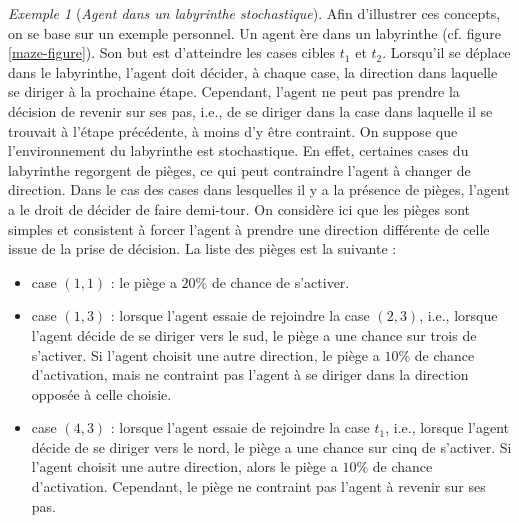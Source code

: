 \documentclass[12pt,a4paper]{report}
\theoremstyle{definition}%
\theoremstyle{remark}
\newtheorem{example}{Exemple}[chapter]
\let\labelitemi\labelitemii
\begin{document}
\begin{example}[\textit{Agent dans un labyrinthe stochastique}] \label{maze-agent}
Afin d'illustrer ces concepts, on se base sur un exemple personnel. Un agent ère dans un labyrinthe (cf. figure \ref{maze-figure}). Son but est d'atteindre les cases cibles
$t_1$ et $t_2$. Lorsqu'il se déplace
dans le labyrinthe, l'agent doit décider, à chaque case, la
direction dans laquelle se diriger à la prochaine étape. Cependant, l'agent
ne peut pas prendre la décision de revenir sur ses pas, i.e., de se
diriger dans la case dans laquelle il se trouvait à l'étape précédente,
à moins d'y être contraint.
On suppose que l'environnement
du labyrinthe est stochastique. En effet, certaines cases du
labyrinthe regorgent de pièges, ce qui peut contraindre l'agent à changer de
direction. Dans le cas des cases dans lesquelles il y a la présence de pièges, l'agent a le droit de décider de faire demi-tour.
On considère ici que les pièges sont simples et consistent à forcer l'agent à
prendre une direction différente de celle issue de la prise de décision.
La liste des pièges est la suivante :
\begin{itemize}
	\renewcommand{\labelitemi}{\tiny$\bullet$}
	\item case $(1, 1)$ : le piège a $20 \%$ de chance de s'activer.
	\item case $(1, 3)$ : lorsque l'agent essaie de rejoindre la case $(2, 3)$,
		i.e., lorsque l'agent décide de se diriger vers le sud, le piège a
		une chance sur trois de s'activer. Si l'agent choisit une autre direction, le piège a $10 \%$ de chance
		d'activation, mais ne contraint pas l'agent à se diriger dans la direction
		opposée à celle choisie.
	\item case $(4, 3)$ : lorsque l'agent essaie de rejoindre la case $t_1$, i.e., lorsque l'agent décide de se diriger vers le nord, le piège a une chance sur cinq de s'activer. Si l'agent choisit une autre
		direction, alors le piège a $10 \%$ de chance d'activation. Cependant, le piège ne
		contraint pas l'agent à revenir sur ses pas.
\end{itemize}
	\begin{figure}[H]
		\centering
		\captionsetup{justification=centering}

\end{figure}
\end{example}
\end{document}

